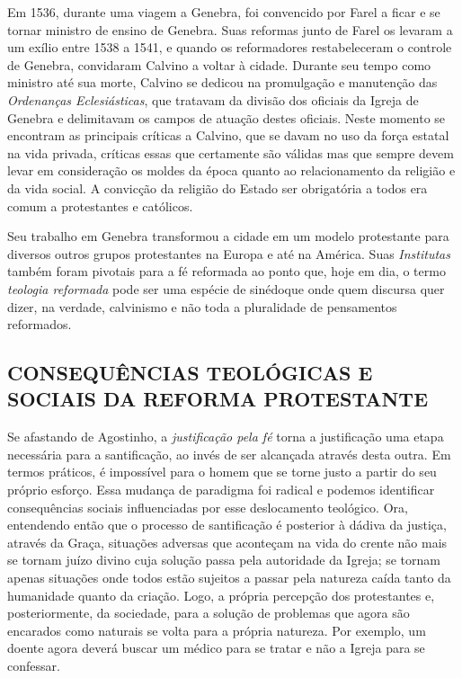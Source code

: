 \documentclass[
    article,            %
	12pt,				%
	oneside,			%
	a4paper,			%
	chapter=TITLE,		%
	section=TITLE,		%
	english,			%
	french,				%
	spanish,			%
	brazil				%
	]{abntex2}
\begin{document}
Em 1536, durante uma viagem a Genebra, foi convencido por Farel a ficar e se tornar ministro de ensino de Genebra. Suas reformas junto de Farel os levaram a um exílio entre 1538 a 1541, e quando os reformadores restabeleceram o controle de Genebra, convidaram Calvino a voltar à cidade. Durante seu tempo como ministro até sua morte, Calvino se dedicou na promulgação e manutenção das \emph{Ordenanças Eclesiásticas}, que tratavam da divisão dos oficiais da Igreja de Genebra e delimitavam os campos de atuação destes oficiais. Neste momento se encontram as principais críticas a Calvino, que se davam no uso da força estatal na vida privada, críticas essas que certamente são válidas mas que sempre devem levar em consideração os moldes da época quanto ao relacionamento da religião e da vida social. A convicção da religião do Estado ser obrigatória a todos era comum a protestantes e católicos. 

Seu trabalho em Genebra transformou a cidade em um modelo protestante para diversos outros grupos protestantes na Europa e até na América. Suas \emph{Institutas} também foram pivotais para a fé reformada ao ponto que, hoje em dia, o termo \emph{teologia reformada} pode ser uma espécie de sinédoque onde quem discursa quer dizer, na verdade, calvinismo e não toda a pluralidade de pensamentos reformados. 

\subsection{CONSEQUÊNCIAS TEOLÓGICAS E SOCIAIS DA REFORMA PROTESTANTE}
Se afastando de Agostinho, a \emph{justificação pela fé} torna a justificação uma etapa necessária para a santificação, ao invés de ser alcançada através desta outra. Em termos práticos, é impossível para o homem que se torne justo a partir do seu próprio esforço. Essa mudança de paradigma foi radical e podemos identificar consequências sociais influenciadas por esse deslocamento teológico. Ora, entendendo então que o processo de santificação é posterior à dádiva da justiça, através da Graça, situações adversas que aconteçam na vida do crente não mais se tornam juízo divino cuja solução passa pela autoridade da Igreja; se tornam apenas situações onde todos estão sujeitos a passar pela natureza caída tanto da humanidade quanto da criação. Logo, a própria percepção dos protestantes e, posteriormente, da sociedade, para a solução de problemas que agora são encarados como naturais se volta para a própria natureza. Por exemplo, um doente agora deverá buscar um médico para se tratar e não a Igreja para se confessar.
\end{document}
